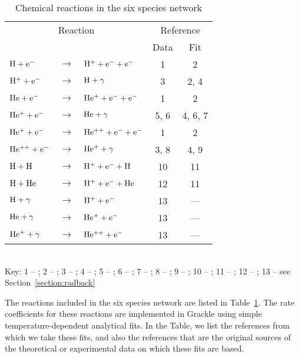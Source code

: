 \begin{table}
\caption{Chemical reactions in the six species network \label{tab:six}}
\begin{tabular}{lclcc}
\hline
\multicolumn{3}{c}{Reaction} & \multicolumn{2}{c}{Reference} \\
& & & Data & Fit \\
\hline
${\rm H + e^{-}}$ & $\rightarrow$ & $\rm{H^{+} + e^{-} + e^{-}}$ & 1 & 2 \\
${\rm H^{+} + e^{-}}$ & $\rightarrow$ & $\rm{H + \gamma} $ & 3 & 2, 4\\
${\rm He + e^{-}}$ & $\rightarrow$ & ${\rm He^{+} + e^{-} + e^{-}}$ & 1 & 2 \\
${\rm He^{+} + e^{-}}$ & $\rightarrow$ & ${\rm He + \gamma}$ & 5, 6 & 4, 6, 7 \\
${\rm He^{+} + e^{-}}$ & $\rightarrow$ & ${\rm He^{++} + e^{-} + e^{-}}$ & 1 & 2 \\
${\rm He^{++} + e^{-}}$ & $\rightarrow$ & ${\rm He^{+} + \gamma}$ & 3, 8 & 4, 9 \\
${\rm H + H}$ & $\rightarrow$ & ${\rm H^{+} + e^{-} + H}$ & 10 & 11 \\
${\rm H + He}$ & $\rightarrow$ & ${\rm H^{+} + e^{-} + He}$ & 12 & 11 \\
${\rm H + \gamma}$ & $\rightarrow$ & ${\rm H^{+} + e^{-}}$ & 13 & --- \\
${\rm He + \gamma}$ & $\rightarrow$ & ${\rm He^{+} + e^{-}}$ & 13 & --- \\
${\rm He^{+} + \gamma}$ & $\rightarrow$ & ${\rm He^{++} + e^{-}}$ & 13 & --- \\
\hline
\end{tabular}
\\ Key: 1 -- \citet{1987ephh.book.....J}; 2 -- \citet{1997NewA....2..181A}; 3 -- \citet{1992ApJ...387...95F}; 4 -- \citet{1997MNRAS.292...27H}; 5 -- \citet{1960MNRAS.121..471B}; 6 -- \citet{1973A&A....25..137A}; 7 -- \citet{1981MNRAS.197..553B}; 8 -- \citet{1978ppim.book.....S}; 9 -- \citet{1992ApJS...78..341C}; 10 -- \citet{1987PhRvA..36.3100G}; 11 -- \citet{1991ApJS...76..759L}; 12 -- \citet{1981JChPh..74..314V}; 13 -- see Section~\ref{section:radback}
\end{table}

The reactions included in the six species network are listed in Table~\ref{tab:six}. The rate coefficients for these reactions are implemented in
Grackle using simple temperature-dependent analytical fits. In the Table, we list the references from which we take these fits, and also the 
references that are the original sources of the theoretical or experimental  data on which these fits are based.

